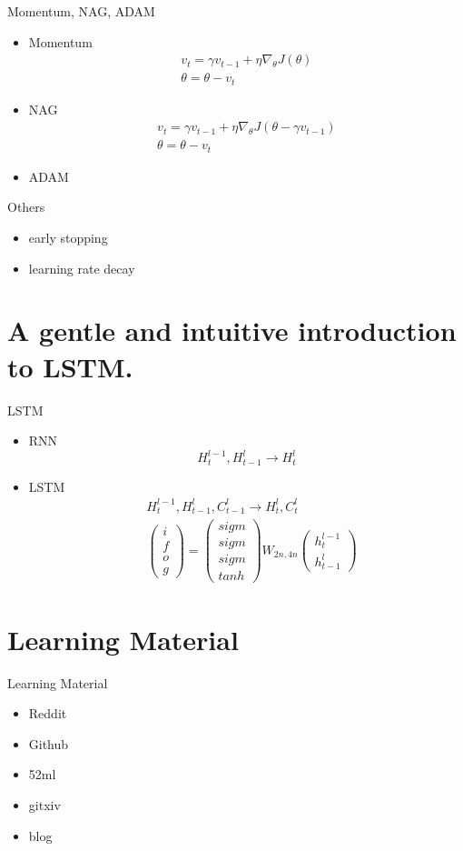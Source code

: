 \documentclass{beamer}
\begin{document}
\begin{frame}{Momentum, NAG, ADAM}
	\begin{itemize}
		\item{Momentum}
			\begin{align*}
				v_t=\gamma v_{t-1} + \eta \nabla_\theta J(\theta) \\
				\theta = \theta - v_t
			\end{align*}
		\item{NAG}
			\begin{align*}
				v_t=\gamma v_{t-1} + \eta \nabla_\theta J(\theta - \gamma v_{t-1})  \\
				\theta = \theta - v_t
			\end{align*}
		\item{ADAM}
	\end{itemize}
\end{frame}

\begin{frame}{Others}
	\begin{itemize}
		\item{early stopping}
		\item{learning rate decay}
	\end{itemize}
\end{frame}


\section{A gentle and intuitive introduction to LSTM.}
\begin{frame}{LSTM}
		\begin{itemize}
			\item{RNN}
			$$H^{l-1}_t, H^{l}_{t-1} \longrightarrow H^l_t$$
			\item{LSTM}
			\begin{align*}
				&H^{l-1}_t,H^l_{t-1},C^l_{t-1} \longrightarrow H^l_t,C^l_t
				\\
				&\begin{pmatrix}
					i\\
					f\\
					o\\
					g
				\end{pmatrix} = 
				\begin{pmatrix}
					sigm\\
					sigm\\
					sigm\\
					tanh
				\end{pmatrix}
				W_{2n,4n} 
				\begin{pmatrix}
					h^{l-1}_t\\
					h^l_{t-1}
				\end{pmatrix}
			\end{align*}
		\end{itemize}
\end{frame}
\section{Learning Material}
\begin{frame}{Learning Material}
	\begin{itemize}
		\item{Reddit}
		\item{Github}
		\item{52ml}
		\item{gitxiv}
		\item{blog}
	\end{itemize}
\end{frame}
\end{document}
